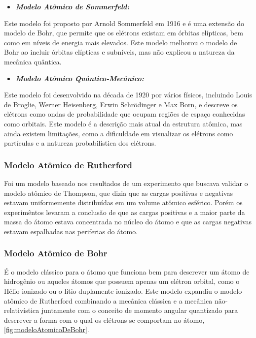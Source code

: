 \documentclass[11pt,a4paper]{article}
\begin{document}
            \begin{itemize}
                \item \textbf{\textit{\textcolor{CarnationPink}{Modelo Atômico de Sommerfeld:}}}
            \end{itemize}

                Este modelo foi proposto por Arnold Sommerfeld em 1916 e é uma extensão do modelo de Bohr, que permite que os elétrons existam em órbitas elípticas, bem como em níveis de energia mais elevados. Este modelo melhorou o modelo de Bohr ao incluir órbitas elípticas e subníveis, mas não explicou a natureza da mecânica quântica.


            \begin{itemize}
                \item \textbf{\textit{\textcolor{CarnationPink}{Modelo Atômico Quântico-Mecânico:}}}
            \end{itemize}

                Este modelo foi desenvolvido na década de 1920 por vários físicos, incluindo Louis de Broglie, Werner Heisenberg, Erwin Schrödinger e Max Born, e descreve os elétrons como ondas de probabilidade que ocupam regiões de espaço conhecidas como orbitais. Este modelo é a descrição mais atual da estrutura atômica, mas ainda existem limitações, como a dificuldade em visualizar os elétrons como partículas e a natureza probabilística dos elétrons.
        
            \subsubsection{Modelo Atômico de Rutherford}

                Foi um modelo baseado nos resultados de um experimento que buscava validar o modelo atômico de Thompson, que dizia que as cargas positivas e negativas estavam uniformemente distribuídas em um volume atômico esférico. Porém os experimêntos levaram a conclusão de que as cargas positivas e a maior parte da massa do átomo estava concentrada no núcleo do átomo e que as cargas negativas estavam espalhadas nas periferias do átomo. 

            \subsubsection{Modelo Atômico de Bohr}

                É o modelo clássico para o átomo que funciona bem para descrever um átomo de hidrogênio ou aqueles átomos que possuem apenas um elétron orbital, como o Hélio ionizado ou o lítio duplamente ionizado. Este modelo expandiu o modelo atômico de Rutherford combinando a mecânica clássica e a mecânica não-relativística juntamente com o conceito de momento angular quantizado para descrever a forma com o qual os elétrons se comportam no átomo, \ref{fig:modeloAtomicoDeBohr}.
\end{document}
